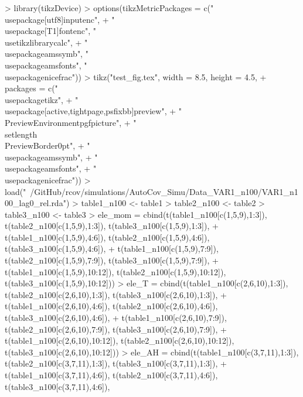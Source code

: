 \documentclass{article}
\begin{document}


\begin{Schunk}
\begin{Sinput}
> library(tikzDevice)
> options(tikzMetricPackages = c("\\usepackage[utf8]{inputenc}",
+     "\\usepackage[T1]{fontenc}", "\\usetikzlibrary{calc}",
+     "\\usepackage{amssymb}", "\\usepackage{amsfonts}", "\\usepackage{nicefrac}"))
> tikz("test_fig.tex", width = 8.5, height = 4.5,
+      packages = c("\\usepackage{tikz}",
+                  "\\usepackage[active,tightpage,psfixbb]{preview}",
+                  "\\PreviewEnvironment{pgfpicture}",
+                  "\\setlength\\PreviewBorder{0pt}",
+                  "\\usepackage{amssymb}",
+                  "\\usepackage{amsfonts}",
+                  "\\usepackage{nicefrac}"))
> load("~/GitHub/rcov/simulations/AutoCov_Simu/Data_VAR1_n100/VAR1_n100_lag0_rel.rda")
> table1_n100 <- table1
> table2_n100 <- table2
> table3_n100 <- table3
> ele_mom = cbind(t(table1_n100[c(1,5,9),1:3]), t(table2_n100[c(1,5,9),1:3]), t(table3_n100[c(1,5,9),1:3]),
+                 t(table1_n100[c(1,5,9),4:6]), t(table2_n100[c(1,5,9),4:6]), t(table3_n100[c(1,5,9),4:6]),
+                 t(table1_n100[c(1,5,9),7:9]), t(table2_n100[c(1,5,9),7:9]), t(table3_n100[c(1,5,9),7:9]),
+                 t(table1_n100[c(1,5,9),10:12]), t(table2_n100[c(1,5,9),10:12]), t(table3_n100[c(1,5,9),10:12]))
> ele_T = cbind(t(table1_n100[c(2,6,10),1:3]), t(table2_n100[c(2,6,10),1:3]), t(table3_n100[c(2,6,10),1:3]),
+               t(table1_n100[c(2,6,10),4:6]), t(table2_n100[c(2,6,10),4:6]), t(table3_n100[c(2,6,10),4:6]),
+               t(table1_n100[c(2,6,10),7:9]), t(table2_n100[c(2,6,10),7:9]), t(table3_n100[c(2,6,10),7:9]),
+               t(table1_n100[c(2,6,10),10:12]), t(table2_n100[c(2,6,10),10:12]), t(table3_n100[c(2,6,10),10:12]))
> ele_AH = cbind(t(table1_n100[c(3,7,11),1:3]), t(table2_n100[c(3,7,11),1:3]), t(table3_n100[c(3,7,11),1:3]),
+                t(table1_n100[c(3,7,11),4:6]), t(table2_n100[c(3,7,11),4:6]), t(table3_n100[c(3,7,11),4:6]),

\end{Sinput}
\end{Schunk}
\end{document}
